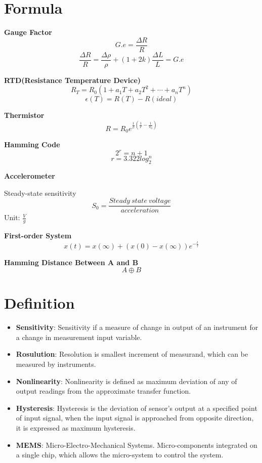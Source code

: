 \documentclass{article}
\begin{document}
\Large
  \section{Formula}
\textbf{Gauge Factor} $$ G.e = \frac{\Delta R}{R} $$
$$\frac{\Delta R}{R} = \frac{\Delta \rho}{\rho} + (1+2k)\frac{\Delta L}{L} = G.e$$

\textbf{RTD(Resistance Temperature Device)} 
$$R_T = R_0(1+a_1T + a_2T^2 + \cdots + a_nT^n)$$
$$\epsilon(T) = R(T) - R(ideal)$$


\textbf{Thermistor}
$$R = R_0e^{\frac{1}{\beta}(\frac{1}{T} - \frac{1}{T_0})}$$

\textbf{Hamming Code}
$$2^r = n+1$$
$$ r = 3.322log_2^n$$

\textbf{Accelerometer}

Steady-state sensitivity
$$ S_0 = \frac{Steady\ state \ voltage}{acceleration} $$ 
Unit: $\frac{V}{g}$

\textbf{First-order System}
$$x(t) = x(\infty) + (x(0) - x(\infty))e^{-\frac{t}{\tau}}$$

\textbf{Hamming Distance Between A and B}
$$A \oplus B$$



   \section{Definition}
   \begin{itemize}
    \item \textbf{Sensitivity}: Sensitivity if a measure of change in output of an instrument for a change in measurement input variable.
    \item \textbf{Rosulution}: Resolution is smallest increment of measurand, which can be measured by instruments.
    
    \item \textbf{Nonlinearity}: Nonlinearity is defined as maximum deviation of any of output readings from the approximate transfer function.
    
    \item \textbf{Hysteresis}: Hysteresis is the deviation of sensor's output at a specified point of input signal, when the input signal is approached from opposite direction, it is expressed as maximum hysteresis.
    
    \item \textbf{MEMS}: Micro-Electro-Mechanical Systems. Micro-components integrated on a single chip, which allows the micro-system to control the system.
   \end{itemize}
\end{document}
